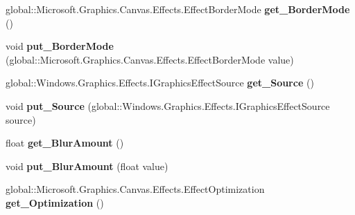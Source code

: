 \begin{DoxyCompactItemize}
global\+::\+Microsoft.\+Graphics.\+Canvas.\+Effects.\+Effect\+Border\+Mode {\bfseries get\+\_\+\+Border\+Mode} ()
\item 
\mbox{\label{interface_microsoft_1_1_graphics_1_1_canvas_1_1_effects_1_1_i_gaussian_blur_effect_a206e8f9a37a96c96af289283beac798d}} 
void {\bfseries put\+\_\+\+Border\+Mode} (global\+::\+Microsoft.\+Graphics.\+Canvas.\+Effects.\+Effect\+Border\+Mode value)
\item 
\mbox{\label{interface_microsoft_1_1_graphics_1_1_canvas_1_1_effects_1_1_i_gaussian_blur_effect_a843c2c9b086f2e10542ae9aa2b39a3f6}} 
global\+::\+Windows.\+Graphics.\+Effects.\+I\+Graphics\+Effect\+Source {\bfseries get\+\_\+\+Source} ()
\item 
\mbox{\label{interface_microsoft_1_1_graphics_1_1_canvas_1_1_effects_1_1_i_gaussian_blur_effect_a366b87bbdd12c4d7eeb1c50ae1c56d3d}} 
void {\bfseries put\+\_\+\+Source} (global\+::\+Windows.\+Graphics.\+Effects.\+I\+Graphics\+Effect\+Source source)
\item 
\mbox{\label{interface_microsoft_1_1_graphics_1_1_canvas_1_1_effects_1_1_i_gaussian_blur_effect_a88a386d562a3ed84bdcebfeffa5d35c0}} 
float {\bfseries get\+\_\+\+Blur\+Amount} ()
\item 
\mbox{\label{interface_microsoft_1_1_graphics_1_1_canvas_1_1_effects_1_1_i_gaussian_blur_effect_a977d2c3c0ddaac5ffbbedae24b0a0770}} 
void {\bfseries put\+\_\+\+Blur\+Amount} (float value)
\item 
\mbox{\label{interface_microsoft_1_1_graphics_1_1_canvas_1_1_effects_1_1_i_gaussian_blur_effect_a2d4f490b0296608bf9c8cd9d42125733}} 
global\+::\+Microsoft.\+Graphics.\+Canvas.\+Effects.\+Effect\+Optimization {\bfseries get\+\_\+\+Optimization} ()
\item 
\mbox{\label{interface_microsoft_1_1_graphics_1_1_canvas_1_1_effects_1_1_i_gaussian_blur_effect_a9ea1c87990030f61d07b28648580ea03}} 

\end{DoxyCompactItemize}
